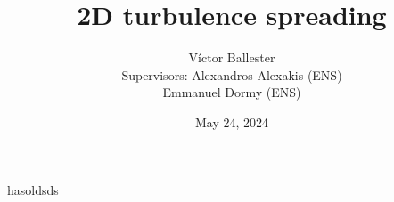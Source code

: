 \documentclass{beamer} %
\title{2D turbulence spreading}
\author{
	Víctor Ballester\texorpdfstring{\vspace{0.15cm}\\}{}{\small Supervisors: Alexandros Alexakis (ENS)\\
\qquad\qquad\; Emmanuel Dormy (ENS)}}
\date{May 24, 2024}
\begin{document}
\frame{\titlepage}
\begin{frame}
	hasoldsds
\end{frame}
\end{document}
